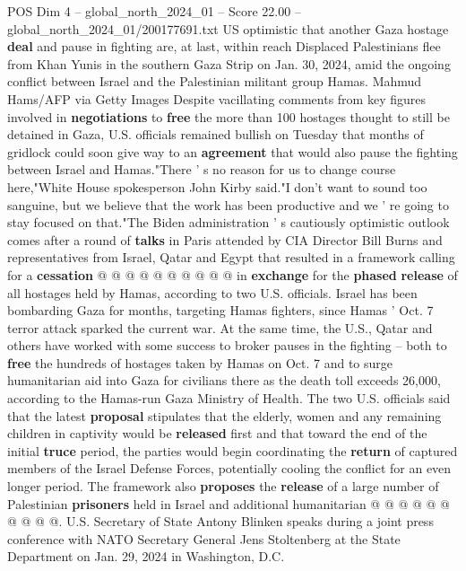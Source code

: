 \begin{textsample}{POS Dim 4 – global\_north\_2024\_01 – Score 22.00 – global\_north\_2024\_01/200177691.txt}  \label{ex:f4_pos_341}
US optimistic that another Gaza hostage \textbf{deal} and pause in fighting are, at last, within reach Displaced Palestinians flee from Khan Yunis in the southern Gaza Strip on Jan. 30, 2024, amid the ongoing conflict between Israel and the Palestinian militant group Hamas.
Mahmud Hams/AFP via Getty Images Despite vacillating comments from key figures involved in \textbf{negotiations} to \textbf{free} the more than 100 hostages thought to still be detained in Gaza, U.S. officials remained bullish on Tuesday that months of gridlock could soon give way to an \textbf{agreement} that would also pause the fighting between Israel and Hamas."There ' s no reason for us to change course here,"White House spokesperson John Kirby said."I don't want to sound too sanguine, but we believe that the work has been productive and we ' re going to stay focused on that."The Biden administration ' s cautiously optimistic outlook comes after a round of \textbf{talks} in Paris attended by CIA Director Bill Burns and representatives from Israel, Qatar and Egypt that resulted in a framework calling for a \textbf{cessation} @ @ @ @ @ @ @ @ @ @ in \textbf{exchange} for the \textbf{phased} \textbf{release} of all hostages held by Hamas, according to two U.S. officials.
Israel has been bombarding Gaza for months, targeting Hamas fighters, since Hamas ' Oct. 7 terror attack sparked the current war.
At the same time, the U.S., Qatar and others have worked with some success to broker pauses in the fighting -- both to \textbf{free} the hundreds of hostages taken by Hamas on Oct. 7 and to surge humanitarian aid into Gaza for civilians there as the death toll exceeds 26,000, according to the Hamas-run Gaza Ministry of Health.
The two U.S. officials said that the latest \textbf{proposal} stipulates that the elderly, women and any remaining children in captivity would be \textbf{released} first and that toward the end of the initial \textbf{truce} period, the parties would begin coordinating the \textbf{return} of captured members of the Israel Defense Forces, potentially cooling the conflict for an even longer period.
The framework also \textbf{proposes} the \textbf{release} of a large number of Palestinian \textbf{prisoners} held in Israel and additional humanitarian @ @ @ @ @ @ @ @ @ @.
U.S.
Secretary of State Antony Blinken speaks during a joint press conference with NATO Secretary General Jens Stoltenberg at the State Department on Jan. 29, 2024 in Washington, D.C.

\end{textsample}
